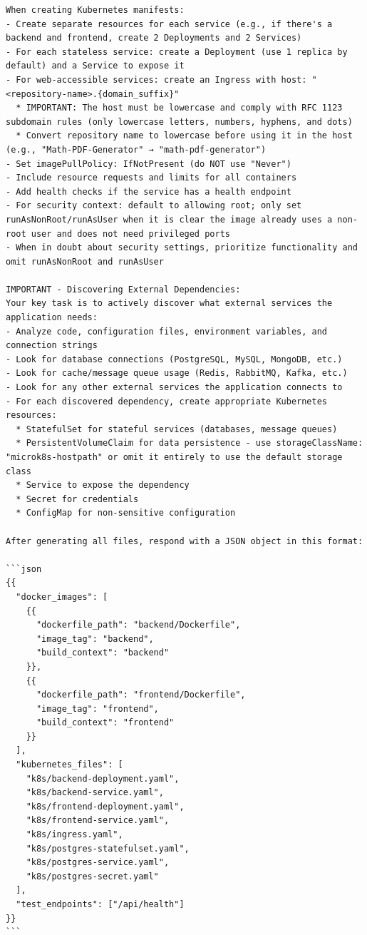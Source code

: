 \documentclass[
    bindingoffset=5mm,  %
    footnoteindent=3mm, %
    hyphenation=true    %
]{src/wut-thesis}
\begin{document}
\begin{verbatim}
When creating Kubernetes manifests:
- Create separate resources for each service (e.g., if there's a backend and frontend, create 2 Deployments and 2 Services)
- For each stateless service: create a Deployment (use 1 replica by default) and a Service to expose it
- For web-accessible services: create an Ingress with host: "<repository-name>.{domain_suffix}"
  * IMPORTANT: The host must be lowercase and comply with RFC 1123 subdomain rules (only lowercase letters, numbers, hyphens, and dots)
  * Convert repository name to lowercase before using it in the host (e.g., "Math-PDF-Generator" → "math-pdf-generator")
- Set imagePullPolicy: IfNotPresent (do NOT use "Never")
- Include resource requests and limits for all containers
- Add health checks if the service has a health endpoint
- For security context: default to allowing root; only set runAsNonRoot/runAsUser when it is clear the image already uses a non-root user and does not need privileged ports
- When in doubt about security settings, prioritize functionality and omit runAsNonRoot and runAsUser

IMPORTANT - Discovering External Dependencies:
Your key task is to actively discover what external services the application needs:
- Analyze code, configuration files, environment variables, and connection strings
- Look for database connections (PostgreSQL, MySQL, MongoDB, etc.)
- Look for cache/message queue usage (Redis, RabbitMQ, Kafka, etc.)
- Look for any other external services the application connects to
- For each discovered dependency, create appropriate Kubernetes resources:
  * StatefulSet for stateful services (databases, message queues)
  * PersistentVolumeClaim for data persistence - use storageClassName: "microk8s-hostpath" or omit it entirely to use the default storage class
  * Service to expose the dependency
  * Secret for credentials
  * ConfigMap for non-sensitive configuration

After generating all files, respond with a JSON object in this format:

```json
{{
  "docker_images": [
    {{
      "dockerfile_path": "backend/Dockerfile",
      "image_tag": "backend",
      "build_context": "backend"
    }},
    {{
      "dockerfile_path": "frontend/Dockerfile",
      "image_tag": "frontend",
      "build_context": "frontend"
    }}
  ],
  "kubernetes_files": [
    "k8s/backend-deployment.yaml",
    "k8s/backend-service.yaml",
    "k8s/frontend-deployment.yaml",
    "k8s/frontend-service.yaml",
    "k8s/ingress.yaml",
    "k8s/postgres-statefulset.yaml",
    "k8s/postgres-service.yaml",
    "k8s/postgres-secret.yaml"
  ],
  "test_endpoints": ["/api/health"]
}}
```


\end{verbatim}
\end{document}
